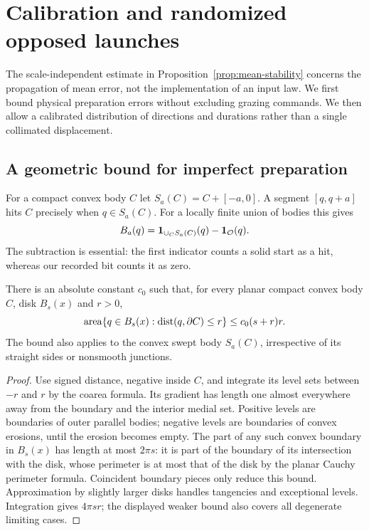 \section{Calibration and randomized opposed launches}
\label{sec:calibration}
The scale-independent estimate in Proposition~\ref{prop:mean-stability}
concerns the propagation of mean error, not the implementation of an
input law. We first bound physical preparation errors without excluding
grazing commands. We then allow a calibrated distribution of directions
and durations rather than a single collimated displacement.

\subsection{A geometric bound for imperfect preparation}
For a compact convex body $C$ let
$S_a(C)=C+[-a,0]$. A segment $[q,q+a]$ hits $C$ precisely when
$q\in S_a(C)$. For a locally finite union of bodies this gives
\begin{equation}\label{eq:morph-bit}
 B_a(q)=\mathbf 1_{\cup_C S_a(C)}(q)-\mathbf 1_{\mathcal O}(q).
\end{equation}
The subtraction is essential: the first indicator counts a solid start
as a hit, whereas our recorded bit counts it as zero.

\begin{lemma}\label{lem:tube}
There is an absolute constant $c_0$ such that, for every planar compact
convex body $C$, disk $B_s(x)$ and $r>0$,
\[
 \operatorname{area}\{q\in B_s(x):\operatorname{dist}(q,\partial C)\le r\}
                 \le c_0(s+r)r.
\]
The bound also applies to the convex swept body $S_a(C)$, irrespective
of its straight sides or nonsmooth junctions.
\end{lemma}
\begin{proof}
Use signed distance, negative inside $C$, and integrate its level sets
between $-r$ and $r$ by the coarea formula. Its gradient has length one
almost everywhere away from the boundary and the interior medial set.
Positive levels are boundaries of outer parallel bodies; negative
levels are boundaries of convex erosions, until the erosion becomes
empty. The part of any such convex boundary in $B_s(x)$ has length at
most $2\pi s$: it is part of the boundary of its intersection with the
disk, whose perimeter is at most that of the disk by the planar Cauchy
perimeter formula. Coincident boundary pieces only reduce this bound.
Approximation by slightly larger disks handles tangencies and exceptional
levels. Integration gives $4\pi sr$; the displayed weaker bound also
covers all degenerate limiting cases.
\end{proof}

